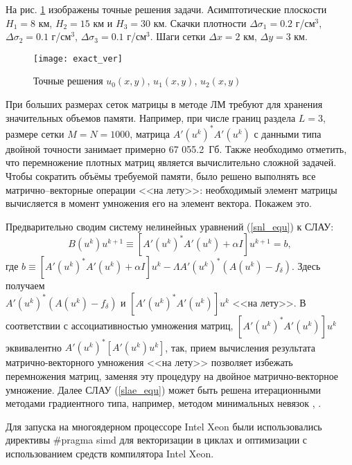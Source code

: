 На рис. \ref{fig:exact_ver} изображены точные решения задачи. Асимптотические плоскости $H_1=8$ км, $H_2=15$ км и $H_3=30$ км. Скачки плотности $\Delta\sigma_1=0.2$ г/см$^3$, $\Delta\sigma_2=0.1$ г/см$^3$, $\Delta\sigma_3=0.1$ г/см$^3$. Шаги сетки $\Delta x=2$ км, $\Delta y=3$ км.
\begin{figure}[H]
	\centering
	\texttt{[image: exact\_ver]}
	\caption{Точные решения $u_0(x,y)$, $u_1(x,y)$, $u_2(x,y)$}
	\label{fig:exact_ver}
\end{figure}

При больших размерах сеток матрицы в методе ЛМ требуют для хранения значительных объемов памяти. Например, при числе границ раздела $L=3$, размере сетки $M=N=1000$, матрица $A'(u^k)^*A'(u^k)$ с данными типа двойной точности занимает примерно  67 055.2~Гб. Также необходимо отметить, что перемножение плотных матриц является вычислительно сложной задачей. Чтобы сократить объёмы требуемой памяти, было решено выполнять все матрично--векторные операции <<на лету>>: необходимый элемент матрицы вычисляется в момент умножения его на элемент вектора. Покажем это.

Предварительно сводим систему нелинейных уравнений (\ref{snl_equ}) к СЛАУ:
\begin{equation}\label{slae_equ}
B(u^k)u^{k+1}\equiv[A'(u^k)^*A'(u^k)+\alpha I]u^{k+1}=b,
\end{equation}
где $b\equiv[A'(u^k)^*A'(u^k)+\alpha I]u^k-\Lambda A'(u^k)^*(A(u^k)-f_\delta)$. Здесь получаем \\ $A'(u^k)^*(A(u^k)-f_\delta)$ и $[A'(u^k)^*A'(u^k)]u^k$ <<на лету>>. В соответствии с ассоциативностью умножения матриц, $[A'(u^k)^*A'(u^k)]u^k$ эквивалентно $A'(u^k)^*[A'(u^k)u^k]$, так, прием вычисления результата матрично-векторного умножения <<на лету>> позволяет избежать перемножения матриц, заменяя эту процедуру на двойное матрично-векторное умножение. Далее СЛАУ (\ref{slae_equ}) может быть решена итерационными методами градиентного типа, например, методом минимальных невязок  \cite{VasEre2009}, \cite{BachZhid1987}.

Для запуска на многоядерном процессоре Intel Xeon были использовались директивы \#pragma simd для векторизации в циклах и оптимизации с использованием средств компилятора Intel Xeon.

